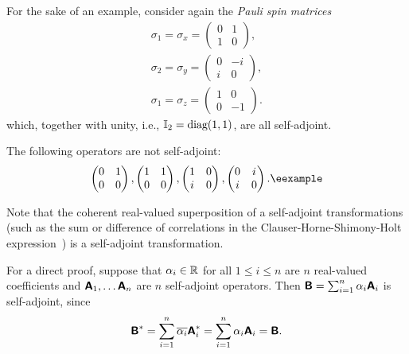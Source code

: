 {\color{blue}
\bexample
For the sake of an example, consider again the
{\em Pauli spin matrices}
\begin{equation}
\begin{split}
\sigma_1=\sigma_x=
\begin{pmatrix}
0&1\\
1&0
\end{pmatrix}
,   \\
\sigma_2=\sigma_y=
\begin{pmatrix}
0&-i\\
i&0
\end{pmatrix}
,   \\
\sigma_1=\sigma_z=
\begin{pmatrix}
1&0\\
0&-1
\end{pmatrix}
.
\end{split}
\end{equation}
which, together with unity, i.e., ${\Bbb I}_2=\textrm{diag}(1,1)$,  are all self-adjoint.

The following operators are not self-adjoint:
\begin{equation}
\begin{pmatrix}
0&1\\
0&0
\end{pmatrix}
 ,
\begin{pmatrix}
1&1\\
0&0
\end{pmatrix}
,
\begin{pmatrix}
1&0\\
i&0
\end{pmatrix}
,
\begin{pmatrix}
0&i\\
i&0
\end{pmatrix}
.{\textrm{\eexample}}
\end{equation}
%
}

Note that the coherent real-valued superposition
of a self-adjoint transformations
(such as the sum or difference of correlations in
the Clauser-Horne-Shimony-Holt expression~\cite{filipp-svo-04-qpoly-prl})
is a self-adjoint transformation.

{\color{OliveGreen}\bproof
For a direct proof,
suppose that $\alpha_i \in {\Bbb R}$ for all $1\le i \le n$ are $n$ real-valued coefficients and
$\textsf{\textbf{A}}_1, \ldots \textsf{\textbf{A}}_n$ are $n$ self-adjoint operators.
Then
$\textsf{\textbf{B}} = \sum_{i=1}^n \alpha_i \textsf{\textbf{A}}_i$
is self-adjoint, since
\begin{equation}
\textsf{\textbf{B}}^* = \sum_{i=1}^n \overline{\alpha_i} \textsf{\textbf{A}}_i^* = \sum_{i=1}^n  \alpha_i  \textsf{\textbf{A}}_i
=\textsf{\textbf{B}}
.
\end{equation}
\eproof
}

